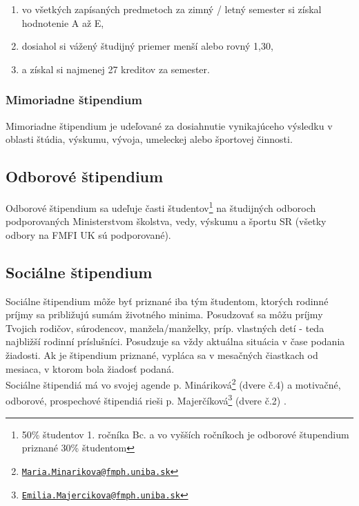 	\begin{enumerate}
		\itemsep0em 
		\item vo všetkých zapísaných predmetoch za zimný / letný semester si získal hodnotenie A až E, 	
		\item dosiahol si vážený študijný priemer menší alebo rovný 1,30,
		\item a získal si najmenej 27 kreditov za semester.
	\end{enumerate}

\subsubsection{Mimoriadne štipendium}

Mimoriadne štipendium je udeľované za dosiahnutie vynikajúceho výsledku v oblasti štúdia, výskumu, vývoja, umeleckej alebo športovej činnosti.

\subsection{Odborové štipendium}

Odborové štipendium sa udeľuje časti študentov\footnote{50\% študentov 1. ročníka Bc. a vo vyšších ročníkoch je odborové štupendium priznané 30\% študentom} na študijných odboroch podporovaných Ministerstvom školstva, vedy, výskumu a športu SR (všetky odbory na FMFI UK sú podporované). 

\subsection{Sociálne štipendium}

Sociálne štipendium môže byť priznané iba tým študentom, ktorých rodinné príjmy sa približujú sumám životného minima. Posudzovať sa môžu príjmy Tvojich rodičov, súrodencov, manžela/manželky, príp. vlastných detí - teda najbližší rodinní príslušníci. Posudzuje sa vždy aktuálna situácia v čase podania žiadosti. Ak je štipendium priznané, vypláca sa v mesačných čiastkach od mesiaca, v ktorom bola žiadosť podaná. \\

Sociálne štipendiá má vo svojej agende p. Mináriková\footnote{\href{mailto:Maria.Minarikova@fmph.uniba.sk}{\texttt{Maria.Minarikova@fmph.uniba.sk}}} (dvere č.4) a motivačné, odborové, prospechové štipendiá rieši p. Majerčíková\footnote{\href{mailto:Emilia.Majercikova@fmph.uniba.sk}{\texttt{Emilia.Majercikova@fmph.uniba.sk}}} (dvere č.2) .\\

